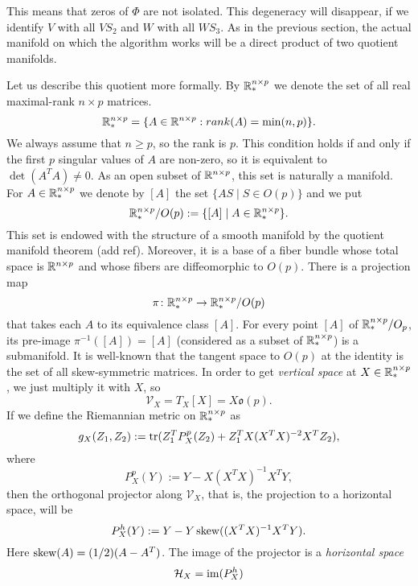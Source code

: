 This means that zeros 
of $\Phi$ are not isolated. This degeneracy will disappear, if
we identify $V$ with all $VS_2$
and $W$ with all $WS_3$. As in the previous section, the actual manifold
on which the algorithm works will be a direct product of two quotient manifolds.



Let us describe this quotient more formally.  
By $\mathbb{R}^{n\times p}_{*}$ we denote the set of all real maximal-rank $n \times p$ matrices.
\begin{equation}
    \mathbb{R}^{n \times p}_{*} = \{ A \in \mathbb{R}^{n \times p} : rank(A) = \min(n,p) \}.
\end{equation}
We always assume that $n \geq p$, so the rank is $p$. This condition holds if and only if
the first $p$ singular values of $A$ are non-zero, so it is equivalent to $\det(A^TA) \neq 0$.
As an open subset of $\mathbb{R}^{n \times p}$, this set is naturally a manifold.
For $A \in \mathbb{R}^{n \times p}_{*}$ we denote by $[A]$ the set 
$\{ AS \mid S \in O(p) \}$ and we put
\begin{equation}
    \mathbb{R}^{n \times p}_{*} / O(p) := \{ [A] \mid A \in \mathbb{R}^{n \times p}_{*} \}.
\end{equation}
This set is endowed with the structure of a smooth manifold by the quotient manifold
theorem (add ref). Moreover, it is a base of a fiber bundle whose total space
is $\mathbb{R}^{n \times p}$ and whose fibers are diffeomorphic to $O(p)$.
There is a projection map
\begin{equation}
    \pi \colon \mathbb{R}^{n \times p}_{*} \to \mathbb{R}^{n \times p}_{*} / O(p)
\end{equation}
that takes each $A$ to its equivalence class $[A]$. For every point $[A]$ of $\mathbb{R}^{n \times p}_{*} / O_p$, its pre-image
$\pi^{-1}( [A] ) = [A]$ (considered as a subset of $\mathbb{R}^{n \times p}_{*}$) is a submanifold.
It is well-known that the tangent space to $O(p)$ at the identity is
the set of all skew-symmetric matrices. In order to get \textit{vertical space}
at $X \in \mathbb{R}^{n \times p}_{*}$, we just multiply it with $X$, so
\begin{equation}
    \mathcal{V}_X = T_X[X] = X \mathfrak{o}(p).
\end{equation}
If we define the Riemannian metric on $\mathbb{R}^{n \times p}_{*}$ as
\begin{equation}
    g_X(Z_1, Z_2) := \operatorname*{tr}(Z_1^T P^p_X(Z_2) + Z_1^T X (X^T X)^{-2} X^T Z_2),
\end{equation}
where 
\begin{equation}
    P^p_X(Y) := Y - X(X^TX)^{-1}X^T Y,
\end{equation}
then the orthogonal projector along $\mathcal{V}_X$, that is, the projection to a horizontal space,
will be 
\begin{equation}
    P^h_X(Y) := Y - Y \operatorname*{skew} ((X^TX)^{-1} X^T Y).
\end{equation}
Here $\operatorname*{skew}(A) = ( 1 / 2) ( A - A^T)$.
The image of the projector is a \textit{horizontal space}
\begin{equation}
    \mathcal{H}_X = \operatorname*{im} (P^h_X)
\end{equation}


